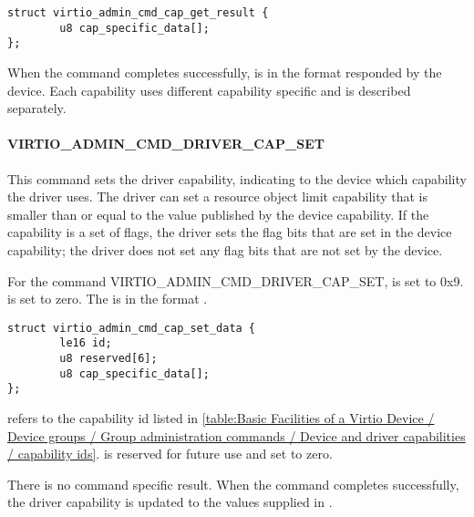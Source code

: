\begin{lstlisting}
struct virtio_admin_cmd_cap_get_result {
        u8 cap_specific_data[];
};
\end{lstlisting}

When the command completes successfully, 
is in the format  responded
by the device. Each capability uses different capability specific
 and is described separately.

\paragraph{VIRTIO_ADMIN_CMD_DRIVER_CAP_SET}\label{par:Basic Facilities of a Virtio Device / Device groups / Group administration commands / Device and driver capabilities / VIRTIO-ADMIN-CMD-DRIVER-CAP-SET}

This command sets the driver capability, indicating to the device which capability
the driver uses. The driver can set a resource object limit capability that is smaller
than or equal to the value published by the device capability.
If the capability is a set of flags, the driver sets the flag bits that are set
in the device capability; the driver does not set any flag bits that are not
set by the device.

For the command VIRTIO_ADMIN_CMD_DRIVER_CAP_SET,  is set to 0x9.
 is set to zero.
The  is in the format
.

\begin{lstlisting}
struct virtio_admin_cmd_cap_set_data {
        le16 id;
        u8 reserved[6];
        u8 cap_specific_data[];
};
\end{lstlisting}

 refers to the capability id listed in \ref{table:Basic Facilities of a Virtio Device / Device groups / Group administration commands / Device and driver capabilities / capability ids}.
 is reserved for future use and set to zero.

There is no command specific result.
When the command completes successfully, the driver capability is updated to
the values supplied in .


